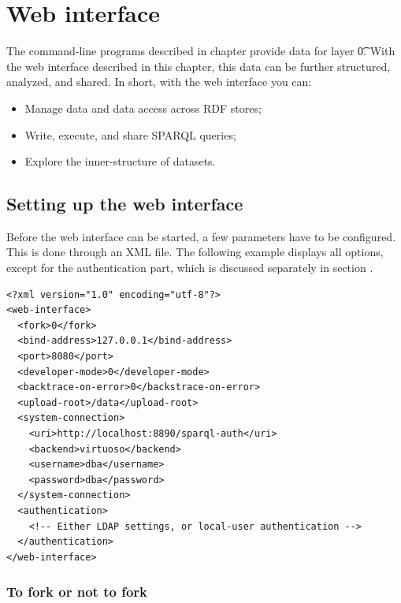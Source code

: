 \chapter{Web interface}
\label{chap:web-interface}

  The command-line programs described in chapter 
  provide data for layer \t{0}.  With the web interface described in
  this chapter, this data can be further structured, analyzed, and shared.
  In short, with the web interface you can:
  \begin{itemize}
  \item Manage data and data access across RDF stores;
  \item Write, execute, and share SPARQL queries;
  \item Explore the inner-structure of datasets.
  \end{itemize}

\section{Setting up the web interface}
\label{sec:configuring-sg-web}

  Before the web interface can be started, a few parameters have to be
  configured.  This is done through an XML file.  The following example
  displays all options, except for the authentication part, which is
  discussed separately in section .

\begin{siderules}
\begin{verbatim}
<?xml version="1.0" encoding="utf-8"?>
<web-interface>
  <fork>0</fork>
  <bind-address>127.0.0.1</bind-address>
  <port>8080</port>
  <developer-mode>0</developer-mode>
  <backtrace-on-error>0</backstrace-on-error>
  <upload-root>/data</upload-root>
  <system-connection>
    <uri>http://localhost:8890/sparql-auth</uri>
    <backend>virtuoso</backend>
    <username>dba</username>
    <password>dba</password>
  </system-connection>
  <authentication>
    <!-- Either LDAP settings, or local-user authentication -->
  </authentication>
</web-interface>
\end{verbatim}
\end{siderules}

\subsection{To fork or not to fork}

